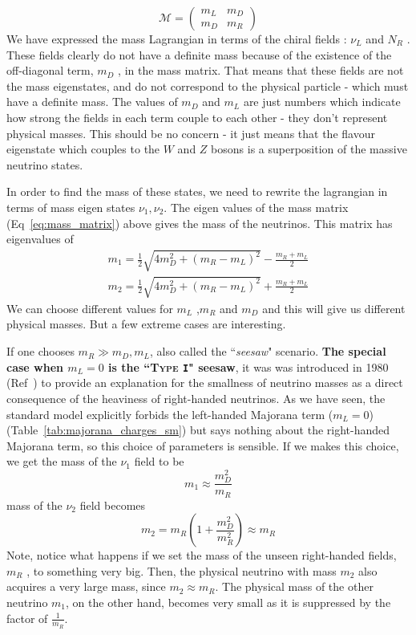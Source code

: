 \begin{equation}
\label{eq:mass_matrix}
    \mathcal{M}  = \begin{pmatrix}
        m_L & m_D\\
        m_D & m_R
    \end{pmatrix}
\end{equation}
We have expressed the mass Lagrangian in terms of the chiral fields : \(\nu _L\) and \(N_R\) . These fields clearly do not have a definite mass because of the existence of the off-diagonal term, \(m_D\) , in the mass matrix. That means that these fields are not the mass eigenstates, and do not correspond to the physical particle - which must have a definite mass. The values of $m_D$ and $m_L$ are just numbers which indicate how strong the fields in each term couple to each other - they
don’t represent physical masses. This should be no concern - it just means that the flavour eigenstate which couples to the $W$ and $Z$ bosons is a superposition of the massive neutrino states.

In order to find the mass of these states, we need to rewrite the lagrangian in terms of mass eigen states \(\nu _1, \nu_2\). The eigen values of the mass matrix (Eq~\ref{eq:mass_matrix}) above gives the mass of the neutrinos. This matrix has eigenvalues of
\begin{equation}
    \begin{gathered}
        m_1 = \frac{1}{2}\sqrt{4m_D^2 + (m_R - m_L)^2} - \frac{m_R+m_L}{2}\\
        m_2 = \frac{1}{2}\sqrt{4m_D^2 + (m_R - m_L)^2} + \frac{m_R+m_L}{2}
    \end{gathered}
\end{equation}
We can choose different values for $m_L$ ,$m_R$ and $m_D$ and this will give us different physical masses. But a few extreme cases are interesting. 

If one chooses $m_R \gg m_D, m_L$, also called the ``\emph{seesaw}" scenario. \textbf{The special case when \(m_L = 0\) is the ``\textsc{Type}   \texttt{I}" seesaw}, it was was introduced in 1980 (Ref~) to provide an explanation for the smallness of neutrino masses as a direct consequence of the heaviness of right-handed neutrinos. As we have seen, the standard model explicitly forbids the left-handed Majorana term ($m_L = 0$) (Table~\ref{tab:majorana_charges_sm}) but says nothing about the right-handed Majorana term, so this choice of parameters is sensible. If we makes this choice, we get the mass of the \(\nu_1\) field to be
\begin{equation}
    m_1 \approx \frac{m_D ^2}{m_R}
\end{equation}
mass of the \(\nu_2\) field becomes 
\begin{equation}
    m_2 = m_R \left(1 + \frac{m_D ^2}{m_R^2}\right)\approx m_R
\end{equation}
Note, notice what happens if we set the mass of the unseen right-handed fields, $m_R$ , to something very big. Then, the physical neutrino with mass
$m_2$ also acquires a very large mass, since $m_2 \approx m_R$.
The physical mass of the other neutrino $m_1$, on the other hand, becomes very small as it is suppressed by the factor of $\frac{1}{m_R}$.

